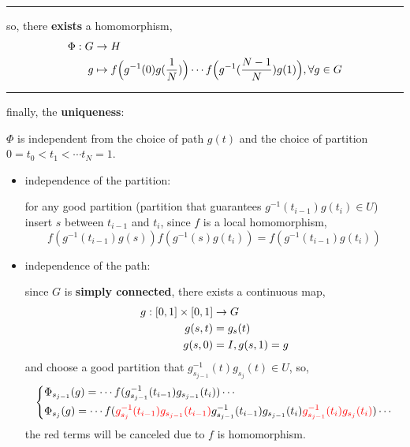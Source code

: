 \begin{itemize}
\begin{tcolorbox}[title=proof:]
		\noindent\rule[0.5ex]{\linewidth}{0.5pt} %
		
		so, there \textbf{exists} a homomorphism,
		\begin{align}
			\Phi : G & \rightarrow H \notag \\
			g & \mapsto f \Big( g^{- 1}(0) g(\frac{1}{N}) \Big) \cdots f \Big( g^{- 1}(\frac{N - 1}{N}) g(1) \Big), \forall g \in G
		\end{align}
		
		\noindent\rule[0.5ex]{\linewidth}{0.5pt} %
		
		finally, the \textbf{uniqueness}:
		
		$\Phi$ is independent from the choice of path $g(t)$ and the choice of partition $0 = t_0 < t_1 < \cdots t_N = 1$.
		\begin{itemize}
			\item independence of the partition:
			
			for any good partition (partition that guarantees $g^{- 1}(t_{i - 1}) g(t_i) \in U$) insert $s$ between $t_{i - 1}$ and $t_i$, since $f$ is a local homomorphism,
			\begin{equation}
				f(g^{- 1}(t_{i - 1}) g(s)) f(g^{- 1}(s) g(t_i)) = f(g^{- 1}(t_{i - 1}) g(t_i))
			\end{equation}
			
			\item independence of the path:
			
			since $G$ is \textbf{simply connected}, there exists a continuous map,
			\begin{align}
				g : [0, 1] \times [0, 1] & \rightarrow G \notag \\
				g(s, t) &= g_s(t) \notag \\
				g(s, 0) &= I, g(s, 1) = g
			\end{align}
			and choose a good partition that $g_{s_{j - 1}}^{- 1}(t) g_{s_j}(t) \in U$, so,
			\begin{equation}
				\begin{dcases}
					\Phi_{s_{j - 1}}(g) = \cdots f(g_{s_{j - 1}}^{- 1}(t_{i - 1}) g_{s_{j - 1}}(t_i)) \cdots \\
					\Phi_{s_j}(g) = \cdots f(\mathcolor{red}{g_{s_j}^{- 1}(t_{i - 1}) g_{s_{j - 1}}(t_{i - 1})} g_{s_{j - 1}}^{- 1}(t_{i - 1}) g_{s_{j - 1}}(t_i) \mathcolor{red}{g_{s_{j - 1}}^{- 1}(t_i) g_{s_j}(t_i)}) \cdots
				\end{dcases}
			\end{equation}
			the red terms will be canceled due to $f$ is homomorphism.
			

\end{itemize}
\end{tcolorbox}
\end{itemize}
